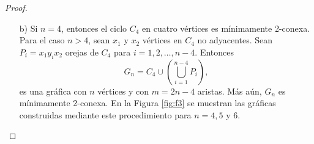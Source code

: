\documentclass[12pt]{article}
\begin{document}
\begin{proof}
\begin{itemize}
    \item[b)] Si $n=4$, entonces el ciclo $C_4$ en cuatro vértices es mínimamente 2-conexa. Para el caso $n > 4$, sean $x_1$ y $x_2$ vértices en $C_4$ no adyacentes. Sean $P_i = x_1 y_i x_2$ orejas de $C_4$ para $i = 1, 2, \ldots, n-4.$ Entonces 
    $$G_n = C_4 \cup \left(\bigcup_{i=1}^{n-4} P_i \right),$$
    es una gráfica con $n$ vértices y con $m = 2n-4$ aristas. Más aún, $G_n$ es mínimamente 2-conexa. En la Figura \ref{fig:f3} se muestran las gráficas construidas mediante este procedimiento para $n=4,5$ y $6.$
    
    \end{itemize}
\end{proof}

\begin{figure}
    \centering

\begin{tikzpicture}[x=0.75pt,y=0.75pt,yscale=-1,xscale=1]


\end{tikzpicture}
\end{figure}
\end{document}
